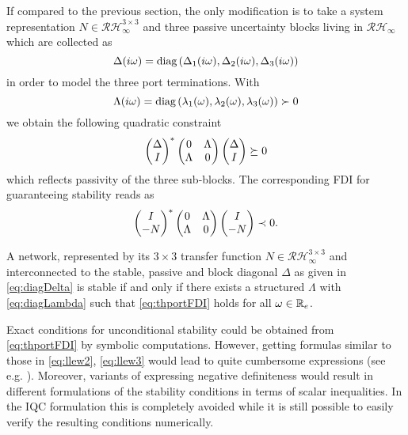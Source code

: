 If compared to the previous section, the only modification is to take a system 
representation $N\in\mathcal{RH}_\infty^{3\times 3}$ and three passive uncertainty 
blocks living in $\mathcal{RH}_\infty$ which are collected as
\begin{equation}
\Delta(i\omega) = \text{diag} \left( \Delta_1(i\omega),\Delta_2(i\omega),\Delta_3(i\omega)\right)
\label{eq:diagDelta}
\end{equation}
in order to model the three port terminations. With
\begin{equation}
\Lambda(i\omega) = \text{diag}\left( \lambda_1(\omega),\lambda_2(\omega),\lambda_3(\omega)\right)\succ 0
\label{eq:diagLambda}
\end{equation}
we obtain the following quadratic constraint
\[
\begin{pmatrix}\Delta\\I\end{pmatrix}^*\begin{pmatrix}0 &\Lambda\\\Lambda &0\end{pmatrix}\begin{pmatrix}\Delta\\I\end{pmatrix}\succeq 0
\]
which reflects passivity of the three sub-blocks. The corresponding FDI for guaranteeing stability reads as
\begin{equation}
\begin{pmatrix}I \\ -N\end{pmatrix}^*
\begin{pmatrix}0 &\Lambda\\\Lambda &0\end{pmatrix}
\begin{pmatrix}I \\ -N\end{pmatrix} \prec 0.
\label{eq:thportFDI}
\end{equation}
\begin{thm}\label{thm:3portll}

A network, represented by its $3\times3$ transfer function $N \in \mathcal{RH}_\infty^{3\times 3}$ 
and in\-ter\-connected to the {stable}, passive and block diagonal $\Delta$ as given in 
\eqref{eq:diagDelta} is stable if and only if there exists a structured $\Lambda$ with 
\eqref{eq:diagLambda} such that \eqref{eq:thportFDI} holds for all $\omega\in\mathbb{R}_e$.
\end{thm}

Exact conditions for unconditional stability could be obtained  from \eqref{eq:thportFDI} 
by symbolic computations. However, getting formulas similar to {those in} \eqref{eq:llew2}, 
\eqref{eq:llew3} would lead to quite cumbersome expressions (see e.g. \cite{kuochu, tan, 
khademian}). Moreover, variants of expressing negative definiteness would result in different 
formulations of the stability conditions in terms of scalar inequalities. In the IQC formulation 
this is completely avoided while it is still possible to easily verify the resulting conditions 
numerically.


